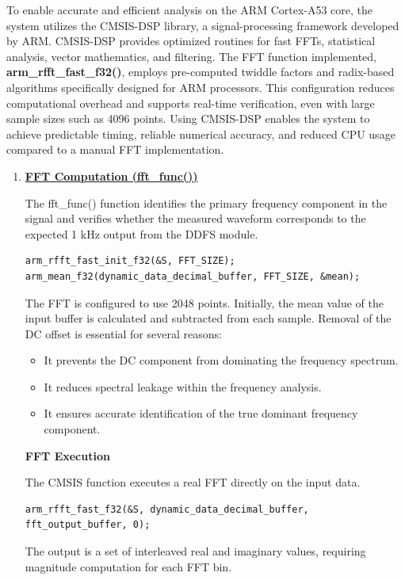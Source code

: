 To enable accurate and efficient analysis on the ARM Cortex-A53 core, the system utilizes the \acs{CMSIS-DSP} library, a signal-processing framework developed by ARM. \acs{CMSIS-DSP} provides optimized routines for fast FFTs, statistical analysis, vector mathematics, and filtering. The \acs{FFT} function implemented, \textbf{arm\_rfft\_fast\_f32()}, employs pre-computed twiddle factors and radix-based algorithms specifically designed for ARM processors. This configuration reduces computational overhead and supports real-time verification, even with large sample sizes such as 4096 points. Using \acs{CMSIS-DSP} enables the system to achieve predictable timing, reliable numerical accuracy, and reduced CPU usage compared to a manual \acs{FFT} implementation.

\begin{enumerate}
	\item \underline{\textbf{\acs{FFT} Computation (fft\_func())}}
	
	The fft\_func() function identifies the primary frequency component in the signal and verifies whether the measured waveform corresponds to the expected 1 kHz output from the \acs{DDFS} module. 
	
	\begin{lstlisting}
arm_rfft_fast_init_f32(&S, FFT_SIZE);
arm_mean_f32(dynamic_data_decimal_buffer, FFT_SIZE, &mean);
	\end{lstlisting}

	The \acs{FFT} is configured to use 2048 points. Initially, the mean value of the input buffer is calculated and subtracted from each sample. Removal of the \acs{DC} offset is essential for several reasons:
	
	\begin{itemize}
		\item It prevents the \acs{DC} component from dominating the frequency spectrum.
		\item It reduces spectral leakage within the frequency analysis.
		\item It ensures accurate identification of the true dominant frequency component.
	\end{itemize}
	
	\textbf{\acs{FFT} Execution}
	
	The CMSIS function executes a real \acs{FFT} directly on the input data.
\begin{lstlisting}
arm_rfft_fast_f32(&S, dynamic_data_decimal_buffer, 
fft_output_buffer, 0);
\end{lstlisting}
	The output is a set of interleaved real and imaginary values, requiring magnitude computation for each \acs{FFT} bin.
	

\end{enumerate}
